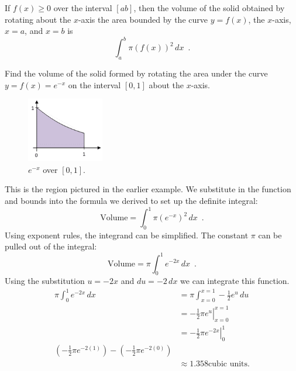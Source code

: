 \begin{theorem}[Volume]
If $f(x)\geq 0$ over the interval $[a b]$, then the volume of the solid obtained by rotating about the $x$-axis the area bounded by the curve $y=f(x)$, the $x$-axis, $x=a$, and $x=b$ is
$$\int_a^b \pi(f(x))^2\,dx \enspace .$$
\end{theorem}
\begin{example}
Find the volume of the solid formed by rotating the area under the curve $y=f(x)=e^{-x}$ on the interval $[0,1]$ about the $x$-axis.

\begin{figure}[!ht]
  \centering
    \includegraphics[width=0.3\textwidth]{img/chap5/image073.png}
    \caption{$e^{-x}$ over $[0,1]$.}
    \label{fig:5-8-enegx}
\end{figure}

\begin{solution}
This is the region pictured in the earlier example. We substitute in the function and bounds into the formula we derived to set up the definite integral:
$$\text{Volume} = \int_0^1 \pi (e^{-x})^2\,dx \enspace .$$
Using exponent rules, the integrand can be simplified. The constant $\pi$ can be pulled out of the integral:
$$\text{Volume} = \pi\int_0^1e^{-2x}\,dx \enspace .$$
Using the substitution $u=-2x$ and $du = -2\,dx$ we can integrate this function.
\begin{align*}
\pi \int_0^1 e^{-2x}\,dx &= \pi\int_{x=0}^{x=1}-\frac{1}{2}e^u\,du\\
  &= \left.-\frac{1}{2}\pi e^u\right|_{x=0}^{x=1} \\
  &= \left.-\frac{1}{2}\pi e^{-2x}\right|_0^1\\
    \left(-\frac{1}{2}\pi e^{-2(1)}\right)-\left(-\frac{1}{2}\pi e^{-2(0)}\right) \\
  &\approx 1.358 \text{cubic units}.
\end{align*}
\end{solution}\end{example}
